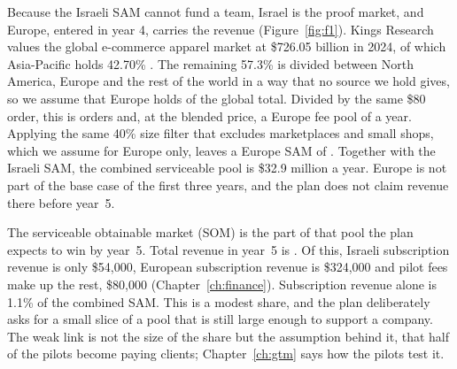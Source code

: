 Because the Israeli SAM cannot fund a team, Israel is the proof market, and Europe, entered in year 4, carries the revenue (Figure~\ref{fig:f1}). Kings Research values the global e-commerce apparel market at \$726.05 billion in 2024, of which Asia-Pacific holds 42.70\% \cite{kings2026}. The remaining 57.3\% is divided between North America, Europe and the rest of the world in a way that no source we hold gives, so we assume that Europe holds  of the global total. Divided by the same \$80 order, this is  orders and, at the blended price, a Europe fee pool of  a year. Applying the same 40\% size filter that excludes marketplaces and small shops, which we assume for Europe only, leaves a Europe SAM of . Together with the Israeli SAM, the combined serviceable pool is \$32.9 million a year. Europe is not part of the base case of the first three years, and the plan does not claim revenue there before year~5.

The serviceable obtainable market (SOM) is the part of that pool the plan expects to win by year~5. Total revenue in year~5 is . Of this, Israeli subscription revenue is only \$54,000, European subscription revenue is \$324,000 and pilot fees make up the rest, \$80,000 (Chapter~\ref{ch:finance}). Subscription revenue alone is 1.1\% of the combined SAM. This is a modest share, and the plan deliberately asks for a small slice of a pool that is still large enough to support a company. The weak link is not the size of the share but the assumption behind it, that half of the pilots become paying clients; Chapter~\ref{ch:gtm} says how the pilots test it.

\ctchapterend
